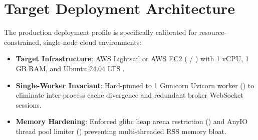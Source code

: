 \section{Target Deployment Architecture}
The production deployment profile is specifically calibrated for resource-constrained, single-node cloud environments:
\begin{itemize}[leftmargin=6mm,itemsep=1.5mm]
    \item \textbf{Target Infrastructure}: AWS Lightsail or AWS EC2 ( / ) with 1 vCPU, 1 GB RAM, and Ubuntu 24.04 LTS \cite{ref:deploy_guide}.
    \item \textbf{Single-Worker Invariant}: Hard-pinned to 1 Gunicorn Uvicorn worker () to eliminate inter-process cache divergence and redundant broker WebSocket sessions.
    \item \textbf{Memory Hardening}: Enforced glibc heap arena restriction () and AnyIO thread pool limiter () preventing multi-threaded RSS memory bloat.
\end{itemize}

